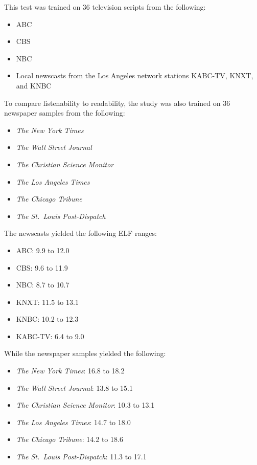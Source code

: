 \documentclass[
]{book}
\providecommand{\tightlist}{%
  \setlength{\itemsep}{0pt}\setlength{\parskip}{0pt}}
\theoremstyle{definition}
\theoremstyle{definition}
\theoremstyle{definition}
\theoremstyle{definition}
\theoremstyle{remark}
\begin{document}
This test was trained on 36 television scripts from the following:

\begin{itemize}
\tightlist
\item
  ABC
\item
  CBS
\item
  NBC
\item
  Local newscasts from the Los Angeles network stations KABC-TV, KNXT, and KNBC
\end{itemize}

To compare listenability to readability, the study was also trained on 36 newspaper samples from the following:

\begin{itemize}
\tightlist
\item
  \emph{The New York Times}
\item
  \emph{The Wall Street Journal}
\item
  \emph{The Christian Science Monitor}
\item
  \emph{The Los Angeles Times}
\item
  \emph{The Chicago Tribune}
\item
  \emph{The St.~Louis Post-Dispatch}
\end{itemize}

The newscasts yielded the following ELF ranges:

\begin{itemize}
\tightlist
\item
  ABC: 9.9 to 12.0
\item
  CBS: 9.6 to 11.9
\item
  NBC: 8.7 to 10.7
\item
  KNXT: 11.5 to 13.1
\item
  KNBC: 10.2 to 12.3
\item
  KABC-TV: 6.4 to 9.0
\end{itemize}

While the newspaper samples yielded the following:

\begin{itemize}
\tightlist
\item
  \emph{The New York Times}: 16.8 to 18.2
\item
  \emph{The Wall Street Journal}: 13.8 to 15.1
\item
  \emph{The Christian Science Monitor}: 10.3 to 13.1
\item
  \emph{The Los Angeles Times}: 14.7 to 18.0
\item
  \emph{The Chicago Tribune}: 14.2 to 18.6
\item
  \emph{The St.~Louis Post-Dispatch}: 11.3 to 17.1
\end{itemize}
\end{document}
